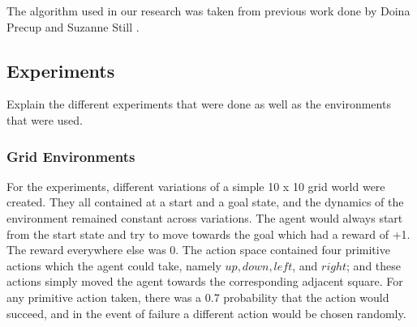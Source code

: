 \documentclass{acm_proc_article-sp}
\begin{document}

The algorithm used in our research was taken from previous work done by Doina Precup and Suzanne Still \cite{still}.

\subsection{Experiments}

Explain the different experiments that were done as well as the environments that were used.

\subsubsection{Grid Environments}


For the experiments, different variations of a simple 10 x 10 grid world were created. They all contained at a start and a goal state, and the dynamics of the environment remained constant across variations. The agent would always start from the start state and try to move towards the goal which had a reward of +1. The reward everywhere else was 0. The action space contained four primitive actions which the agent could take, namely $up, down, left$, and $right$; and these actions simply moved the agent towards the corresponding adjacent square. For any primitive action taken, there was a 0.7 probability that the action would succeed, and in the event of failure a different action would be chosen randomly. 


\end{document}
